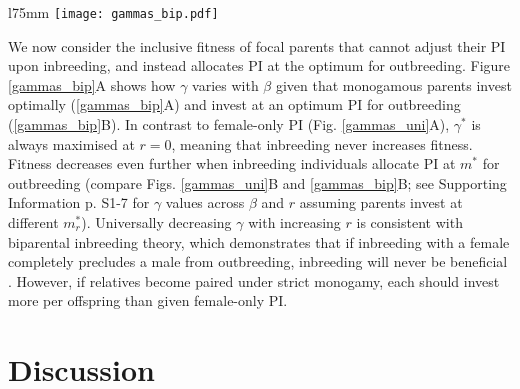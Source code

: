 \documentclass[10pt,letterpaper]{article}
\begin{document}
\begin{wrapfigure}[23]{l}{75mm}
\texttt{[image: gammas\_bip.pdf]}
\captionsetup{labelformat=empty} 
\caption{} 
\label{gammas_bip} %
\end{wrapfigure} %
We now consider the inclusive fitness of focal parents that cannot adjust their PI upon inbreeding, and instead allocates PI at the optimum for outbreeding. Figure \ref{gammas_bip}A shows how $\gamma$ varies with $\beta$ given that monogamous parents invest optimally (\ref{gammas_bip}A) and invest at an optimum PI for outbreeding (\ref{gammas_bip}B). In contrast to female-only PI (Fig. \ref{gammas_uni}A), $\gamma^{*}$ is always maximised at $r=0$, meaning that inbreeding never increases fitness. Fitness decreases even further when inbreeding individuals allocate PI at $m^{*}$ for outbreeding (compare Figs. \ref{gammas_uni}B and \ref{gammas_bip}B; see Supporting Information p. S1-7 for $\gamma$ values across $\beta$ and $r$ assuming parents invest at different $m^{*}_{r}$). Universally decreasing $\gamma$ with increasing $r$ is consistent with biparental inbreeding theory, which demonstrates that if inbreeding with a female completely precludes a male from outbreeding, inbreeding will never be beneficial \cite[][]{Waser1986, Duthie2015a}. However, if relatives become paired under strict monogamy, each should invest more per offspring than given female-only PI.

\section*{Discussion}
\end{document}
